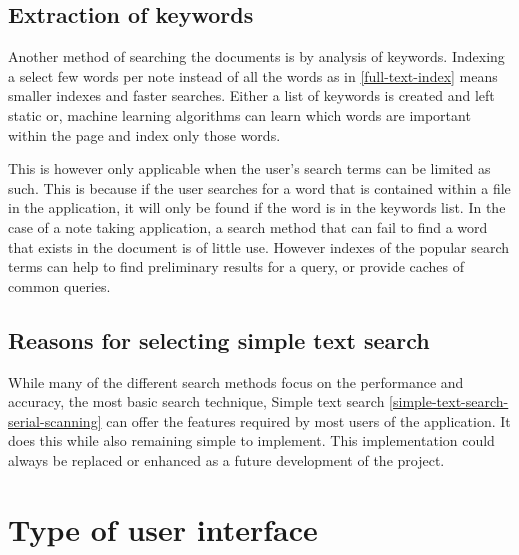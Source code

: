 \subsection{Extraction of keywords}\label{extraction-of-keywords}

Another method of searching the documents is by analysis of keywords. Indexing a
select few words per note instead of all the words as in \ref{full-text-index}
means smaller indexes and faster searches.
Either a list of keywords is created and left static or, machine learning
algorithms can learn which words are important within the page and index only
those words.

This is however only applicable when the user's search terms can be limited as
such. This is because if the user searches for a word that is contained within a
file in the application, it will only be found if the word is in the keywords
list. In the case of a note taking application, a search method that can fail to
find a word that exists in the  document is of little use. However indexes of
the popular search terms can help to find preliminary results for a query, or
provide caches of common queries.




\subsection{Reasons for selecting simple text
search}\label{reasons-for-selecting-simple-text-search}

While many of the different search methods focus on the performance and 
accuracy, the most basic search technique, Simple text search
\ref{simple-text-search-serial-scanning} can offer the features required by most
users of the application. It does this while also remaining simple to implement.
This implementation could always be replaced or enhanced as a future
development of the project.

\section{Type of user interface}\label{type-of-user-interface}

